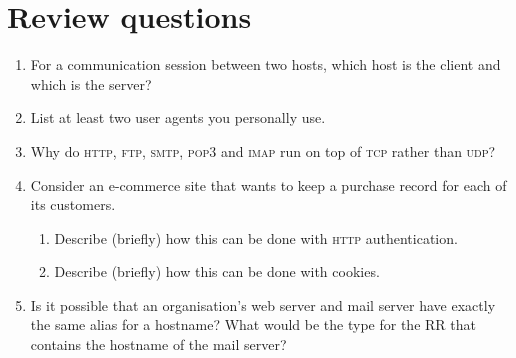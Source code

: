 \documentclass[12pt,a4paper]{article}
\begin{document}
\section{Review questions}

\begin{enumerate}

  \item For a communication session between two hosts, which host is
    the client and which is the server?

  \item List at least two user agents you personally use.

  \item Why do \textsc{http}, \textsc{ftp}, \textsc{smtp},
    \textsc{pop3} and \textsc{imap} run on top of \textsc{tcp} rather
    than \textsc{udp}?

  \item Consider an e-commerce site that wants to keep a purchase
    record for each of its customers.
  \begin{enumerate}

    \item Describe (briefly) how this can be done with \textsc{http}
      authentication.

    \item Describe (briefly) how this can be done with cookies.

  \end{enumerate}

  \item Is it possible that an organisation's web server and mail
    server have exactly the same alias for a hostname? What would be
    the type for the RR that contains the hostname of the mail server?

\end{enumerate}
\end{document}
